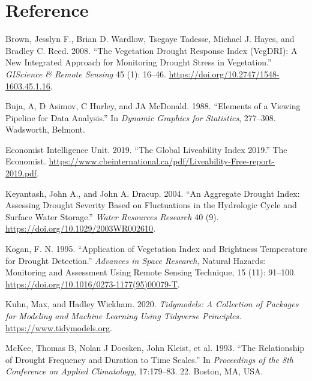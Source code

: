 \documentclass[
]{article}
\newlength{\cslhangindent}
\newlength{\cslentryspacingunit} %
\newenvironment{CSLReferences}[2] %
 {%
  \setlength{\parindent}{0pt}
  \ifodd #1
  \let\oldpar\par
  \def\par{\hangindent=\cslhangindent\oldpar}
  \fi
  \setlength{\parskip}{#2\cslentryspacingunit}
 }%
 {}
\begin{document}
\hypertarget{reference}{%
\section*{Reference}\label{reference}}

\hypertarget{refs}{}
\begin{CSLReferences}{1}{0}
\leavevmode{}%
Brown, Jesslyn F., Brian D. Wardlow, Tsegaye Tadesse, Michael J. Hayes,
and Bradley C. Reed. 2008. {``The {Vegetation} {Drought} {Response}
{Index} ({VegDRI}): {A} {New} {Integrated} {Approach} for {Monitoring}
{Drought} {Stress} in {Vegetation}.''} \emph{GIScience \& Remote
Sensing} 45 (1): 16--46.
\url{https://doi.org/10.2747/1548-1603.45.1.16}.

\leavevmode{}%
Buja, A, D Asimov, C Hurley, and JA McDonald. 1988. {``Elements of a
Viewing Pipeline for Data Analysis.''} In \emph{Dynamic Graphics for
Statistics}, 277--308. Wadsworth, Belmont.

\leavevmode{}%
Economist Intelligence Unit. 2019. {``The Global Liveability Index
2019.''} The Economist.
\url{https://www.cbeinternational.ca/pdf/Liveability-Free-report-2019.pdf}.

\leavevmode{}%
Keyantash, John A., and John A. Dracup. 2004. {``An Aggregate Drought
Index: {Assessing} Drought Severity Based on Fluctuations in the
Hydrologic Cycle and Surface Water Storage.''} \emph{Water Resources
Research} 40 (9). \url{https://doi.org/10.1029/2003WR002610}.

\leavevmode{}%
Kogan, F. N. 1995. {``Application of Vegetation Index and Brightness
Temperature for Drought Detection.''} \emph{Advances in Space Research},
Natural {Hazards}: {Monitoring} and {Assessment} {Using} {Remote}
{Sensing} {Technique}, 15 (11): 91--100.
\url{https://doi.org/10.1016/0273-1177(95)00079-T}.

\leavevmode{}%
Kuhn, Max, and Hadley Wickham. 2020. \emph{Tidymodels: A Collection of
Packages for Modeling and Machine Learning Using Tidyverse Principles.}
\url{https://www.tidymodels.org}.

\leavevmode{}%
McKee, Thomas B, Nolan J Doesken, John Kleist, et al. 1993. {``The
Relationship of Drought Frequency and Duration to Time Scales.''} In
\emph{Proceedings of the 8th Conference on Applied Climatology},
17:179--83. 22. Boston, MA, USA.


\end{CSLReferences}
\end{document}
